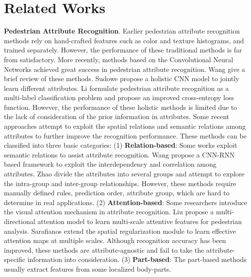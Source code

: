 \documentclass[10pt,twocolumn,letterpaper]{article}
\begin{document}
\section{Related Works} \label{sec:related-works}
\textbf{Pedestrian Attribute Recognition}.
Earlier pedestrian attribute recognition methods \cite{deng2014pedestrian,layne2012pedestrian,zhu2013pedestrian} rely on hand-crafted features such as color and texture histograms, and trained separately.
However, the performance of these traditional methods is far from satisfactory.
More recently, methods based on the Convolutional Neural Networks achieved great success in pedestrian attribute recognition.
Wang \etal \cite{wang2019PARSurvey} give a brief review of these methods.
Sudowe \etal \cite{sudowe2015person} propose a holistic CNN model to jointly learn different attributes.
Li \etal \cite{deepmar} formulate pedestrian attribute recognition as a multi-label classification problem and propose an improved cross-entropy loss function.
However, the performance of these holistic methods is limited due to the lack of consideration of the prior information in attributes.
Some recent approaches attempt to exploit the spatial relations and semantic relations among attributes to further improve the recognition performance.
These methods can be classified into three basic categories:
(1) \textbf{Relation-based}:
Some works \cite{wang2017attribute,zhao2018grouping} exploit semantic relations to assist attribute recognition.
Wang \etal \cite{wang2017attribute} propose a CNN-RNN based framework to exploit the interdependency and correlation among attributes.
Zhao \etal \cite{zhao2018grouping} divide the attributes into several groups and attempt to explore the intra-group and inter-group relationships.
However, these methods require manually defined rules, \eg prediction order, attribute group, which are hard to determine in real applications.
(2) \textbf{Attention-based}:
Some researchers \cite{hpnet,deepimb,deepview,zhuspatialreg} introduce the visual attention mechanism in attribute recognition.
Liu \etal \cite{hpnet} propose a multi-directional attention model to learn multi-scale attentive features for pedestrian analysis.
Sarafianos \etal \cite{deepimb} extend the spatial regularization module \cite{zhuspatialreg} to learn effective attention maps at multiple scales.
Although recognition accuracy has been improved, these methods are attribute-agnostic and fail to take the attribute-specific information into consideration.
(3) \textbf{Part-based}: The part-based methods usually extract features from some localized body-parts.
\end{document}

